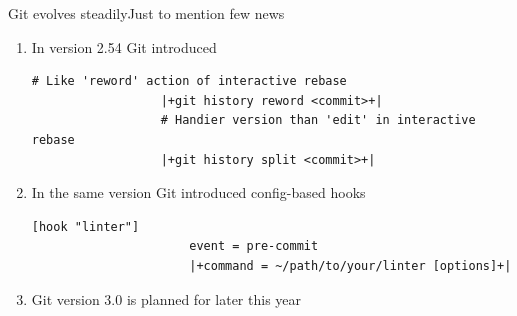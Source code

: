 \documentclass[usenames,svgnames,14pt]{beamer}
\begin{document}
\begin{frame}[fragile]{Git evolves steadily}{Just to mention few news}
    \vspace{-2mm}
    \begin{enumerate}
        \item In version 2.54 Git introduced\\
              \begin{lstlisting}[style=MyBash, aboveskip=3mm, xrightmargin=15mm,
                                 moredelim={[is][\color{basic-color}]{|+}{+|}}]
                  # Like 'reword' action of interactive rebase
                  |+git history reword <commit>+|
                  # Handier version than 'edit' in interactive rebase
                  |+git history split <commit>+|
              \end{lstlisting}
        \item In the same version Git introduced config-based hooks\\
              \begin{lstlisting}[style=MyBash, aboveskip=3mm, xrightmargin=15mm,
                                 moredelim={[is][\color{basic-color}]{|+}{+|}}]
                  [hook "linter"]
                      event = pre-commit
                      |+command = ~/path/to/your/linter [options]+|
              \end{lstlisting}
        \item Git version 3.0 is planned for later this year\\
              \then {}
    \end{enumerate}
\end{frame}
\end{document}

